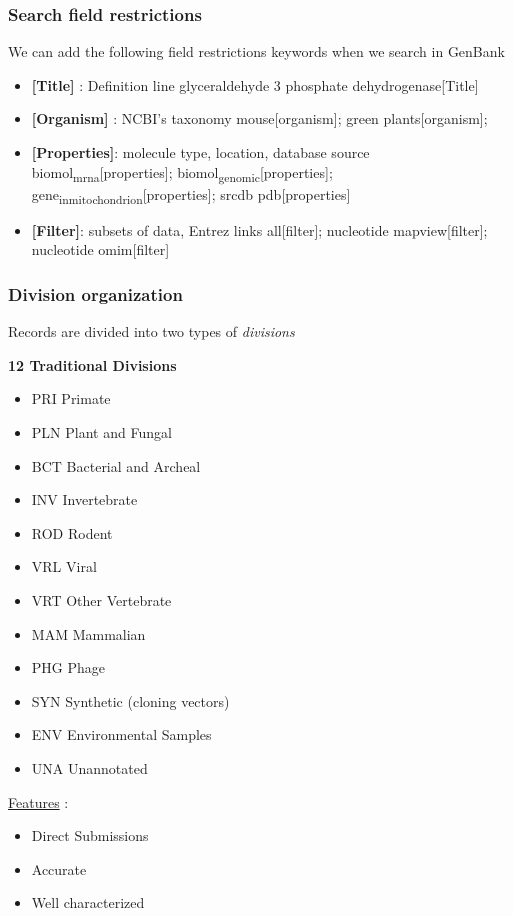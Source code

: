 \documentclass[11pt]{article}
\begin{document}
\subsubsection{Search field restrictions}
\label{sec:orgd9010d9}
We can add the following field restrictions keywords when we search in GenBank

\begin{itemize}
\item \textbf{[Title]} : Definition line glyceraldehyde 3
phosphate dehydrogenase[Title]
\item \textbf{[Organism]} : NCBI's taxonomy mouse[organism];
green plants[organism];
\item \textbf{[Properties]}: molecule type, location, database source
biomol\textsubscript{mrna}[properties]; biomol\textsubscript{genomic}[properties];
gene\textsubscript{in}\textsubscript{mitochondrion}[properties]; srcdb pdb[properties]
\item \textbf{[Filter]}: subsets of data, Entrez links
all[filter]; nucleotide mapview[filter]; nucleotide omim[filter]
\end{itemize}


\subsubsection{Division organization}
\label{sec:org34ddf38}
Records are divided into two types of \emph{divisions}

\textbf{12 Traditional Divisions}\\
\begin{itemize}
\item PRI Primate
\item PLN Plant and Fungal
\item BCT Bacterial and Archeal
\item INV Invertebrate
\item ROD Rodent
\item VRL Viral
\item VRT Other Vertebrate
\item MAM Mammalian
\item PHG Phage
\item SYN Synthetic (cloning vectors)
\item ENV Environmental Samples
\item UNA Unannotated
\end{itemize}

\uline{Features} :
\begin{itemize}
\item Direct Submissions
\item Accurate
\item Well characterized
\end{itemize}
\end{document}

